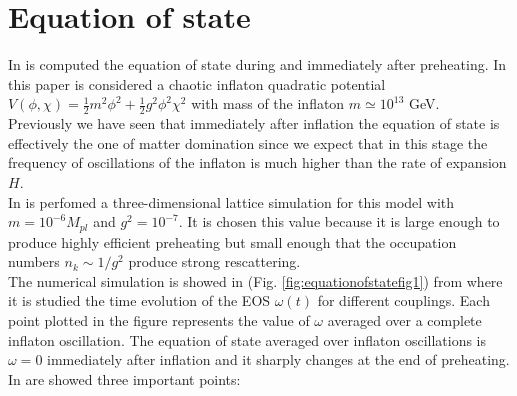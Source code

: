 \documentclass[11pt,a4paper,twoside]{book}
\begin{document}
\section{Equation of state}
In \cite{Chap7:Peloso_Thermalitation} is computed the equation of state during and immediately after preheating. In this paper is considered a chaotic inflaton quadratic potential $ V(\phi,\chi)=\frac{1}{2}m^{2}\phi^{2}+\frac{1}{2}g^{2}\phi^{2}\chi^{2} $ with  mass of the inflaton $ m\simeq 10^{13} $ GeV.\\
Previously we have seen that  immediately after inflation the equation of state is effectively the one of matter domination since we expect that in this stage the frequency of oscillations of the inflaton  is much higher than the rate of expansion $ H $.\\
In \cite{Chap7:Peloso_Thermalitation} is perfomed a three-dimensional lattice simulation for this model with $ m=10^{-6} M_{pl} $ and $ g^{2}=10^{-7} $. It is chosen this value because it is large enough to produce highly efficient preheating but small enough that the occupation numbers $ n_{k} \sim 1/g^{2}$ produce strong rescattering.\\
The numerical simulation is showed in (Fig. \ref{fig:equationofstatefig1}) from \cite{Chap7:Peloso_Thermalitation} where it is studied the time evolution of the EOS $ \omega(t) $ for different couplings.
Each point plotted in the figure represents the value of $\omega$ averaged over a complete inflaton oscillation. The equation of state averaged over inflaton oscillations is $\omega = 0$ immediately after inflation and it sharply changes at the end of preheating. In \cite{Chap7:Peloso_Thermalitation} are showed  three important points:
\end{document}

